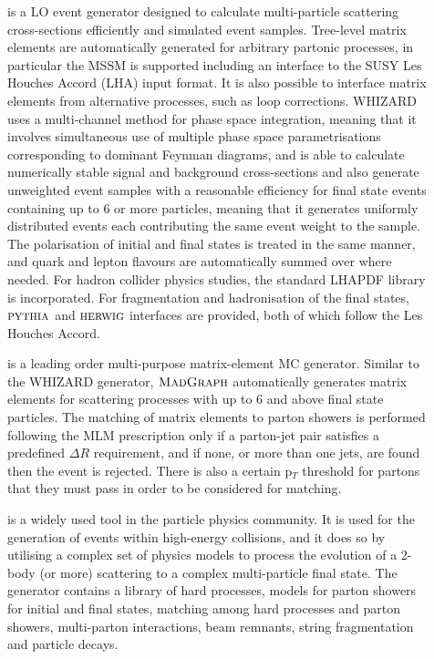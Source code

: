 \begin{description}

	\item[\WHIZARD] \cite{WHIZARD} is a LO event generator designed to calculate multi-particle scattering cross-sections efficiently and simulated event samples. Tree-level matrix elements are automatically generated for arbitrary partonic processes, in particular the MSSM is supported including an interface to the SUSY Les Houches Accord (LHA) input format. It is also possible to interface matrix elements from alternative processes, such as loop corrections. WHIZARD uses a multi-channel method for phase space integration, meaning that it involves simultaneous use of multiple phase space parametrisations corresponding to dominant Feynman diagrams, and is able to calculate numerically stable signal and background cross-sections and also generate unweighted event samples with a reasonable efficiency for final state events containing up to 6 or more particles, meaning that it generates uniformly distributed events each contributing the same event weight to the sample. The polarisation of initial and final states is treated in the same manner, and quark and lepton flavours are automatically summed over where needed. For hadron collider physics studies, the standard LHAPDF library is incorporated. For fragmentation and hadronisation of the final states, ${\textsc{pythia}}$ and ${\textsc{herwig}}$ interfaces are provided, both of which follow the Les Houches Accord. 

	\item[\MADGRAPH] \cite{MADGRAPH5} is a leading order multi-purpose matrix-element MC generator. Similar to the WHIZARD generator, $\textsc{MadGraph}$ automatically generates matrix elements for scattering processes with up to 6 and above final state particles. The matching of matrix elements to parton showers is performed following the MLM prescription \cite{Hoche:2006ph} only if a parton-jet pair satisfies a predefined $\Delta R$ requirement, and if none, or more than one jets, are found then the event is rejected. There is also a certain p$_T$ threshold for partons that they must pass in order to be considered for matching.

	\item[\PYTHIA] \cite{1126-6708-2006-05-026} is a widely used tool in the particle physics community. It is used for the generation of events within high-energy collisions, and it does so by utilising a complex set of physics models to process the evolution of a 2-body (or more) scattering to a complex multi-particle final state. The generator contains a library of hard processes, models for parton showers for initial and final states, matching among hard processes and parton showers, multi-parton interactions, beam remnants, string fragmentation and particle decays.  


\end{description}
